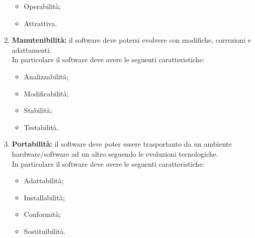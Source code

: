 \begin{enumerate}
\begin{itemize}
			\item Operabilità;
			\item Attrattiva.
		\end{itemize}
	\item \textbf{Manutenibilità:} il software deve potersi evolvere con modifiche, correzioni e adattamenti.\\In particolare il software deve avere le seguenti caratteristiche:
		\begin{itemize}
			\item Analizzabilità;
			\item Modificabilità;
			\item Stabilità;
			\item Testabilità.
		\end{itemize}
	\item \textbf{Portabilità:} il software deve poter essere trasportanto da un ambiente hardware/software ad un altro seguendo le evoluzioni tecnologiche.\\In particolare il software deve avere le seguenti caratteristiche:
		\begin{itemize}
			\item Adattabilità;
			\item Installabilità;
			\item Conformità;
			\item Sostituibilità.
		\end{itemize}
\end{enumerate}
